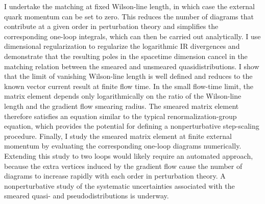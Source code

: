 I undertake the matching at fixed Wilson-line length, in which case the external quark momentum can be set to zero. This reduces the number of diagrams that contribute at a given order in perturbation theory and simplifies the corresponding one-loop integrals, which can then be carried out analytically. I use dimensional regularization to regularize the logarithmic IR divergences and demonstrate that the resulting poles in the spacetime dimension cancel in the matching relation between the smeared and unsmeared quasidistributions. I show that the limit of vanishing Wilson-line length is well defined and reduces to the known vector current result at finite flow time. In the small flow-time limit, the matrix element depends only logarithmically on the ratio of the Wilson-line length and the gradient flow smearing radius. The smeared matrix element therefore satisfies an equation similar to the typical renormalization-group equation, which provides the potential for defining a nonperturbative step-scaling procedure. Finally, I study the smeared matrix element at finite external momentum by evaluating the corresponding one-loop diagrams numerically. Extending this study to two loops would likely require an automated approach, because the extra vertices induced by the gradient flow cause the number of diagrams to increase rapidly with each order in perturbation theory. A nonperturbative study of the systematic uncertainties associated with the smeared quasi- and pseudodistributions is underway.
